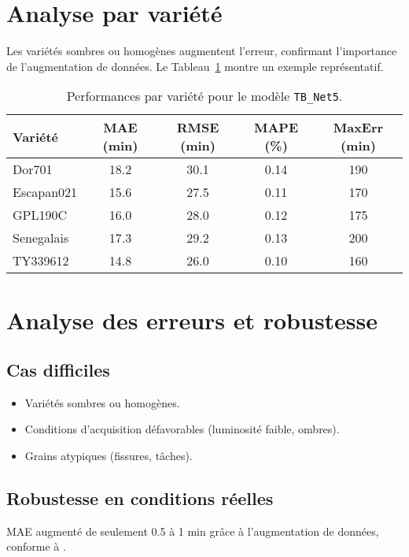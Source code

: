 \section{Analyse par variété}
\label{subsec:analyse_variete}

Les variétés sombres ou homogènes augmentent l’erreur, confirmant l’importance de l’augmentation de données. Le Tableau~\ref{tab:variete_stats} montre un exemple représentatif.

\begin{table}[!ht]
\centering
\caption{Performances par variété pour le modèle \texttt{TB\_Net5}.}
\label{tab:variete_stats}
\begin{tabular}{|l|c|c|c|c|}
\hline
\textbf{Variété} & \textbf{MAE (min)} & \textbf{RMSE (min)} & \textbf{MAPE (\%)} & \textbf{MaxErr (min)} \\
\hline
Dor701 & 18.2 & 30.1 & 0.14 & 190 \\
Escapan021 & 15.6 & 27.5 & 0.11 & 170 \\
GPL190C & 16.0 & 28.0 & 0.12 & 175 \\
Senegalais & 17.3 & 29.2 & 0.13 & 200 \\
TY339612 & 14.8 & 26.0 & 0.10 & 160 \\
\hline
\end{tabular}
\end{table}

\section{Analyse des erreurs et robustesse}
\label{sec:erreurs_robustesse}

\subsection{Cas difficiles}
\begin{itemize}
    \item Variétés sombres ou homogènes.  
    \item Conditions d’acquisition défavorables (luminosité faible, ombres).  
    \item Grains atypiques (fissures, tâches).  
\end{itemize}

\subsection{Robustesse en conditions réelles}
MAE augmenté de seulement 0.5 à 1 min grâce à l’augmentation de données, conforme à \citet{tastan2023}.

